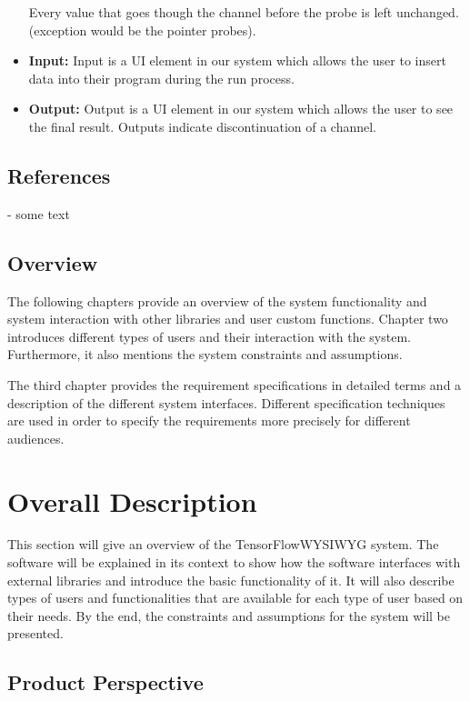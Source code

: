 \documentclass[journal,10pt,onecolumn,compsoc]{IEEEtran} \usepackage[margin=1.0in]{geometry} \usepackage{pdfpages} \usepackage{graphicx}
\begin{document}
\begin{itemize}
		Every value that goes though the channel before the probe is left unchanged. (exception would be the pointer probes).\\
	\item \textbf{Input:}
		Input is a UI element in our system which allows the user to insert data into their program during the run process.\\
	\item \textbf{Output:}
		Output is a UI element in our system which allows the user to see the final result. Outputs indicate discontinuation of a channel.\\
\end{itemize}
\subsection{References}
- some text \\
\subsection{Overview}

The following chapters provide an overview of the system functionality and system interaction with other libraries and user custom functions. 
Chapter two introduces different types of users and their interaction with the system. 
Furthermore, it also mentions the system constraints and assumptions.

The third chapter provides the requirement specifications in detailed terms and a description of the different system interfaces. 
Different specification techniques are used in order to specify the requirements more precisely for different audiences.

\newpage

\section{Overall Description}

This section will give an overview of the TensorFlow\texttrademark WYSIWYG system. 
The software will be explained in its context to show how the software interfaces with external libraries and introduce the basic functionality of it. 
It will also describe types of users  and functionalities that are available for each type of user based on their needs. 
By the end, the constraints and assumptions for the system will be presented.

\subsection{Product Perspective}
\end{document}
